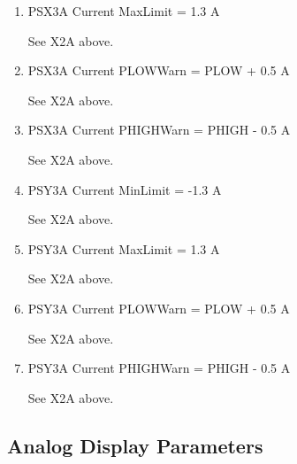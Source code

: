 \documentclass[11pt]{book}		%
\begin{document}
\begin{enumerate}
 \item PSX3A Current MaxLimit = 1.3 A

\color{red}
See X2A above.
\color{black}

 \item PSX3A Current PLOWWarn = PLOW + 0.5 A

\color{red}
See X2A above.
\color{black}

 \item PSX3A Current PHIGHWarn = PHIGH - 0.5 A

\color{red}
See X2A above.
\color{black}

 \item PSY3A Current MinLimit = -1.3 A

\color{red}
See X2A above.
\color{black}

 \item PSY3A Current MaxLimit = 1.3 A

\color{red}
See X2A above.
\color{black}

 \item PSY3A Current PLOWWarn = PLOW + 0.5 A

\color{red}
See X2A above.
\color{black}

 \item PSY3A Current PHIGHWarn = PHIGH - 0.5 A

\color{red}
See X2A above.
\color{black}

\end{enumerate}

\subsection{Analog Display Parameters} \label{sect:cyc-equip-ctl-beamline-sm23a-analog-display}
\end{document}

